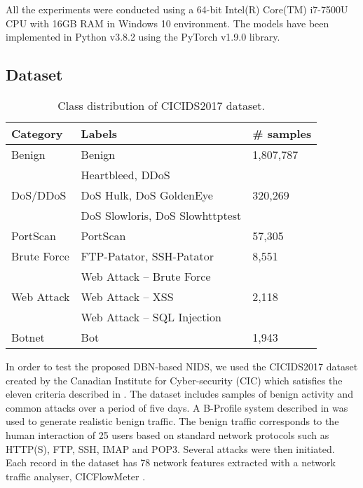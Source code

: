 \documentclass[runningheads]{llncs}
\begin{document}
All the experiments were conducted using a 64-bit Intel(R) Core(TM) i7-7500U CPU with 16GB RAM in Windows 10 environment. The models have been implemented in Python v3.8.2 using the PyTorch v1.9.0 library.

\subsection{Dataset}
\label{subsec:dataset}

\begin{table}[t]
\centering
\caption{Class distribution of CICIDS2017 dataset.}
\begin{tabular}{p{2.5cm}p{5cm}p{2cm}}
\toprule
\bf Category & \bf Labels & \bf \# samples \\
\midrule
Benign                         & Benign                          & 1,807,787                  \\\midrule
\multirow{3}{6em}{DoS/DDoS}    & Heartbleed, DDoS                & \multirow{3}{6em}{320,269} \\
                               & DoS Hulk, DoS GoldenEye         &                            \\
                               & DoS Slowloris, DoS Slowhttptest &                            \\\midrule
PortScan                       & PortScan                        & 57,305                     \\\midrule
Brute Force                    & FTP-Patator, SSH-Patator        & 8,551                      \\\midrule
\multirow{3}{6em}{Web Attack}  & Web Attack – Brute Force        & \multirow{3}{6em}{2,118}   \\
                               & Web Attack – XSS                &                            \\
                               & Web Attack – SQL Injection      &                            \\\midrule
Botnet                         & Bot                             & 1,943                      \\
\bottomrule
\end{tabular}
\label{tab:class_distribution}
\end{table}

In order to test the proposed \ac{DBN}-based NIDS, we used the CICIDS2017 dataset created by the Canadian Institute for Cyber-security (CIC) which satisfies the eleven criteria described in \cite{Sharafaldin}. The dataset includes samples of benign activity and common attacks over a period of five days. A B-Profile system described in \cite{Sharafaldin} was used to generate realistic benign traffic. The benign traffic corresponds to the human interaction of 25 users based on standard network protocols such as HTTP(S), FTP, SSH, IMAP and POP3. Several attacks were then initiated. Each record in the dataset has 78 network features extracted with a network traffic analyser, CICFlowMeter \cite{Sharafaldin}.
\end{document}
